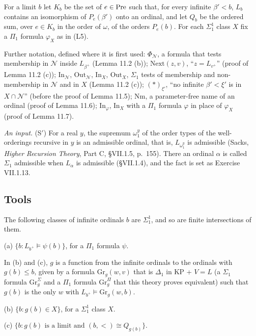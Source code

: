\documentclass[11pt]{article}
\begin{document}
For a limit $b$ let $K_b$ be the set of $e \in \mathrm{Pre}$ such that, for every infinite $\beta' < b$, $L_b$ contains
an isomorphism of $P_e(\beta')$ onto an ordinal, and let $Q_b$ be the ordered sum, over $e \in K_b$ in the order of
$\omega$, of the orders $P_e(b)$. For each $\Sigma^1_1$ class $X$ fix a $\Pi_1$ formula $\varphi_X$ as in (L5).

Further notation, defined where it is first used: $\Phi_{\mathcal N}$, a formula that tests membership in
$\mathcal N$ inside $L_{\beta^+}$ (Lemma 11.2 (b)); $\mathrm{Next}(z, v)$, ``$z = L_{v^+}$'' (proof of Lemma 11.2
(c)); $\mathrm{In}_{\mathcal N}$, $\mathrm{Out}_{\mathcal N}$, $\mathrm{In}_X$, $\mathrm{Out}_X$, $\Sigma_1$ tests of
membership and non-membership in $\mathcal N$ and in $X$ (Lemma 11.2 (c)); $(\ast)_{\xi'}$, ``no infinite
$\beta' < \xi'$ is in $X \cap \mathcal N$'' (before the proof of Lemma 11.5); $\mathrm{Nm}$, a parameter-free name
of an ordinal (proof of Lemma 11.6); $\mathrm{In}_{\varphi}$, $\mathrm{In}_X$ with a $\Pi_1$ formula $\varphi$ in
place of $\varphi_X$ (proof of Lemma 11.7).

\emph{An input.} (S$'$) For a real $y$, the supremum $\omega_1^y$ of the order types of the well-orderings
recursive in $y$ is an admissible ordinal, that is, $L_{\omega_1^y}$ is admissible (Sacks, \emph{Higher Recursion
Theory}, Part C, \S VII.1.5, p.~155). There an ordinal $\alpha$ is called $\Sigma_1$ admissible when $L_{\alpha}$ is
admissible (\S VII.1.4), and the fact is set as Exercise VII.1.13.

\subsection{Tools}

\begin{statement} The following classes of infinite ordinals $b$ are $\Sigma^1_1$, and so are
finite intersections of them.

(a) $\{b : L_{b^+} \models \psi(b)\}$, for a $\Pi_1$ formula $\psi$.

In (b) and (c), $g$ is a function from the infinite ordinals to the ordinals with $g(b) \le b$, given by a
formula $\mathrm{Gr}_g(w, v)$ that is $\Delta_1$ in KP + $V = L$ (a $\Sigma_1$ formula $\mathrm{Gr}^{\Sigma}_g$ and
a $\Pi_1$ formula $\mathrm{Gr}^{\Pi}_g$ that this theory proves equivalent) such that $g(b)$ is the only $w$ with
$L_{b^+} \models \mathrm{Gr}_g(w, b)$.

(b) $\{b : g(b) \in X\}$, for a $\Sigma^1_1$ class $X$.

(c) $\{b : g(b) \text{ is a limit and } (b, <) \cong Q_{g(b)}\}$.
\end{statement}
\end{document}
